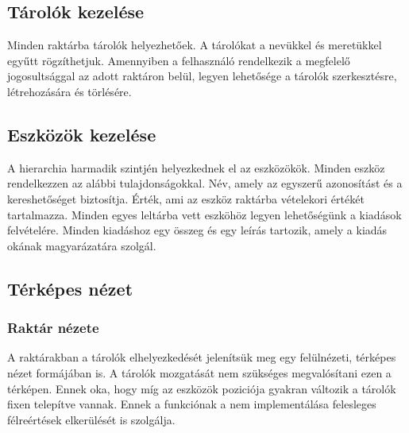 \subsection{Tárolók kezelése}
Minden raktárba tárolók helyezhetőek. A tárolókat a nevükkel és meretükkel egyűtt rögzíthetjuk.
Amennyiben a felhasználó rendelkezik a megfelelő jogosultsággal az adott raktáron belül, legyen lehetősége a tárolók szerkesztésre, létrehozására és törlésére.

\subsection{Eszközök kezelése}
A hierarchia harmadik szintjén helyezkednek el az eszközökök. 
Minden eszköz rendelkezzen az alábbi tulajdonságokkal.
Név, amely az egyszerű azonosítást és a kereshetőséget biztosítja.
Érték, ami az eszköz raktárba vételekori értékét tartalmazza.
Minden egyes leltárba vett eszköhöz legyen lehetőségünk a kiadások felvételére.
Minden kiadáshoz egy összeg és egy leírás tartozik, amely a kiadás okának magyarázatára szolgál.

\subsection{Térképes nézet}
\subsubsection{Raktár nézete}
A raktárakban a tárolók elhelyezkedését jelenítsük meg egy felülnézeti, térképes nézet formájában is.
A tárolók mozgatását nem szükséges megvalósítani ezen a térképen.
Ennek oka, hogy míg az eszközök poziciója gyakran változik a tárolók fixen telepítve vannak.
Ennek a funkciónak a nem implementálása felesleges félreértések elkerülését is szolgálja.

